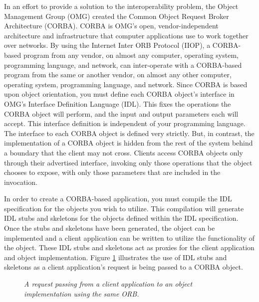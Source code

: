 
In an effort to provide a solution to the interoperability problem, the Object 
Management Group (OMG) created the Common Object Request Broker Architecture
(CORBA).  \cite{siegel}  CORBA is OMG's open, vendor-independent architecture 
and infrastructure that computer applications use to work together over networks.
\cite{omg} By using the Internet Inter ORB Protocol (IIOP), a CORBA-based program 
from any vendor, on almost any computer, operating system, programming language, 
and network, can inter-operate with a CORBA-based program from the same or another 
vendor, on almost any other computer, operating system, programming language, 
and network. \cite{omg} Since CORBA is based upon object orientation, you must 
define each CORBA object's interface in OMG's Interface Definition Language (IDL). 
This fixes the operations the CORBA object will perform, and the input and output 
parameters each will accept.\cite{siegel} This interface definition is independent 
of your programming language. \cite{omg} The interface to each CORBA object is 
defined very strictly. But, in contrast, the implementation of a CORBA object
is hidden from the rest of the system behind a boundary that the client may not 
cross. Clients access CORBA objects only through their advertised interface, 
invoking only those operations that the object chooses to expose, with only 
those parameters that are included in the invocation. \cite{omg}

In order to create a CORBA-based application, you must compile the IDL 
specification for the objects you wish to utilize.  This compilation will 
generate IDL stubs and skeletons for the objects defined within the IDL
specification.  Once the stubs and skeletons have been generated, the 
object can be implemented and a client application can be written to 
utilize the functionality of the object.  
These IDL stubs and skeletons act as proxies for the client application and 
object implementation.\cite{omg} 
Figure \ref{RequestPassing} illustrates the use of IDL stubs and skeletons as 
a client application's request is being passed to a CORBA object.  
 
\begin{figure}
\begin{center}
\leavevmode
\caption{\em{A request passing from a client application to an object implementation using the same ORB}.}
\figline
         \label{RequestPassing}
\end{center}
\end{figure}

